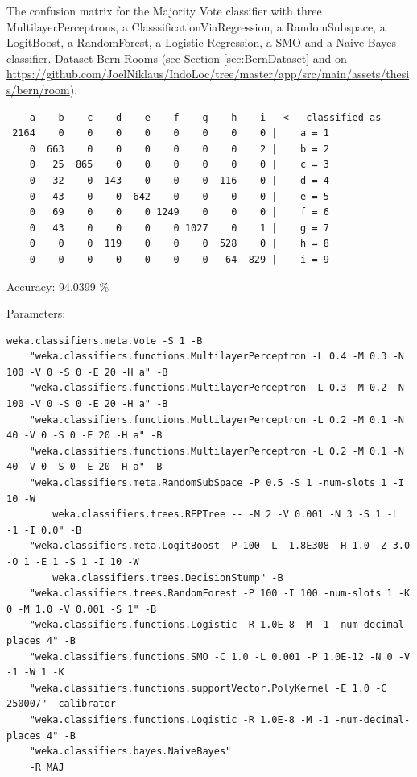 \begin{table}[H]
\caption{The confusion matrix for the Majority Vote classifier with three MultilayerPerceptrons, a ClasssificationViaRegression, a RandomSubspace, a LogitBoost, a RandomForest,  a Logistic Regression,  a SMO and a Naive Bayes classifier. Dataset Bern Rooms (see Section \ref{sec:BernDataset} and on \url{https://github.com/JoelNiklaus/IndoLoc/tree/master/app/src/main/assets/thesis/bern/room}).}
\label{ver:ConfusionMatrixMajorityVote}
\begin{threeparttable}
\begin{verbatim}
    a    b    c    d    e    f    g    h    i   <-- classified as
 2164    0    0    0    0    0    0    0    0 |    a = 1
    0  663    0    0    0    0    0    0    2 |    b = 2
    0   25  865    0    0    0    0    0    0 |    c = 3
    0   32    0  143    0    0    0  116    0 |    d = 4
    0   43    0    0  642    0    0    0    0 |    e = 5
    0   69    0    0    0 1249    0    0    0 |    f = 6
    0   43    0    0    0    0 1027    0    1 |    g = 7
    0    0    0  119    0    0    0  528    0 |    h = 8
    0    0    0    0    0    0    0   64  829 |    i = 9
\end{verbatim}
\begin{tablenotes}
\item Accuracy: 94.0399 \%
\item Parameters:
\tiny{
\begin{verbatim}
weka.classifiers.meta.Vote -S 1 -B
    "weka.classifiers.functions.MultilayerPerceptron -L 0.4 -M 0.3 -N 100 -V 0 -S 0 -E 20 -H a" -B
    "weka.classifiers.functions.MultilayerPerceptron -L 0.3 -M 0.2 -N 100 -V 0 -S 0 -E 20 -H a" -B
    "weka.classifiers.functions.MultilayerPerceptron -L 0.2 -M 0.1 -N 40 -V 0 -S 0 -E 20 -H a" -B
    "weka.classifiers.functions.MultilayerPerceptron -L 0.2 -M 0.1 -N 40 -V 0 -S 0 -E 20 -H a" -B
    "weka.classifiers.meta.RandomSubSpace -P 0.5 -S 1 -num-slots 1 -I 10 -W
        weka.classifiers.trees.REPTree -- -M 2 -V 0.001 -N 3 -S 1 -L -1 -I 0.0" -B
    "weka.classifiers.meta.LogitBoost -P 100 -L -1.8E308 -H 1.0 -Z 3.0 -O 1 -E 1 -S 1 -I 10 -W
        weka.classifiers.trees.DecisionStump" -B
    "weka.classifiers.trees.RandomForest -P 100 -I 100 -num-slots 1 -K 0 -M 1.0 -V 0.001 -S 1" -B
    "weka.classifiers.functions.Logistic -R 1.0E-8 -M -1 -num-decimal-places 4" -B
    "weka.classifiers.functions.SMO -C 1.0 -L 0.001 -P 1.0E-12 -N 0 -V -1 -W 1 -K
    "weka.classifiers.functions.supportVector.PolyKernel -E 1.0 -C 250007" -calibrator
    "weka.classifiers.functions.Logistic -R 1.0E-8 -M -1 -num-decimal-places 4" -B
    "weka.classifiers.bayes.NaiveBayes"
    -R MAJ
\end{verbatim}
}
\end{tablenotes}
\end{threeparttable}
\end{table}

